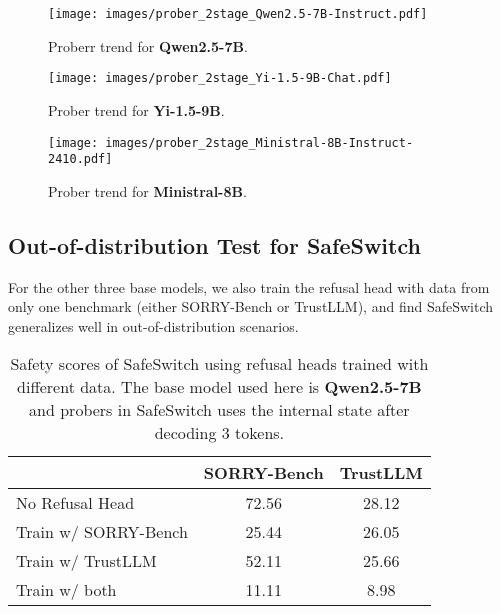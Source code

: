 \begin{figure}[htbp]
    \centering
    \texttt{[image: images/prober\_2stage\_Qwen2.5-7B-Instruct.pdf]}
    \caption{Proberr trend for \textbf{Qwen2.5-7B}.}
\end{figure}

\begin{figure}[htbp]
    \centering
    \texttt{[image: images/prober\_2stage\_Yi-1.5-9B-Chat.pdf]}
    \caption{Prober trend for \textbf{Yi-1.5-9B}.}
\end{figure}

\begin{figure}[htbp]
    \centering
    \texttt{[image: images/prober\_2stage\_Ministral-8B-Instruct-2410.pdf]}
    \caption{Prober trend for \textbf{Ministral-8B}.}
\end{figure}


\subsection{Out-of-distribution Test for SafeSwitch}
For the other three base models, we also train the refusal head with data from only one benchmark (either SORRY-Bench or TrustLLM), and find SafeSwitch generalizes well in out-of-distribution scenarios.

\begin{table}[]
\caption{Safety scores of SafeSwitch using refusal heads trained with different data. The base model used here is \textbf{Qwen2.5-7B} and probers in SafeSwitch uses the internal state after decoding 3 tokens.}
\vspace{2mm}
\centering
\renewcommand{\arraystretch}{1.1}
\begin{tabular}{lcc}
\hline
& SORRY-Bench & TrustLLM \\\hline
No Refusal Head   & 72.56           & 28.12        \\
Train w/ SORRY-Bench            & 25.44           &  26.05     \\
Train w/ TrustLLM               & 52.11           & 25.66       \\
Train w/ both   & 11.11           & 8.98      \\\hline
\end{tabular}
\end{table}


